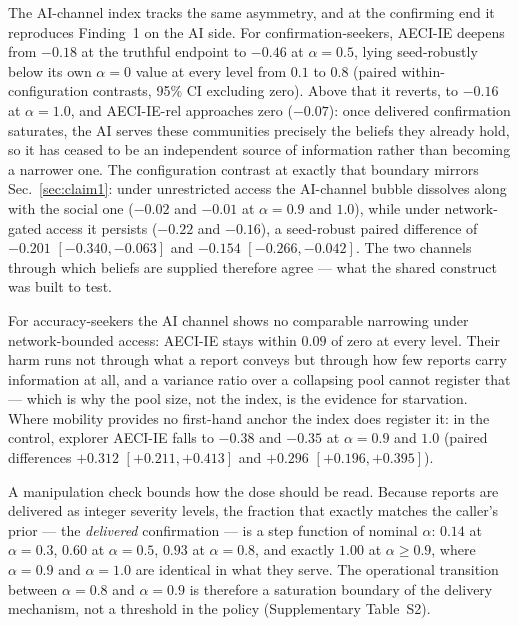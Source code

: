 \documentclass[pdflatex,sn-nature]{sn-jnl}
\begin{document}
The AI-channel index tracks the same asymmetry, and at the confirming end it reproduces Finding~1 on the AI side. For confirmation-seekers, AECI-IE deepens from $-0.18$ at the truthful endpoint to $-0.46$ at $\alpha = 0.5$, lying seed-robustly below its own $\alpha = 0$ value at every level from $0.1$ to $0.8$ (paired within-configuration contrasts, 95\% CI excluding zero). Above that it reverts, to $-0.16$ at $\alpha = 1.0$, and AECI-IE-rel approaches zero ($-0.07$): once delivered confirmation saturates, the AI serves these communities precisely the beliefs they already hold, so it has ceased to be an independent source of information rather than becoming a narrower one. The configuration contrast at exactly that boundary mirrors Sec.~\ref{sec:claim1}: under unrestricted access the AI-channel bubble dissolves along with the social one ($-0.02$ and $-0.01$ at $\alpha = 0.9$ and $1.0$), while under network-gated access it persists ($-0.22$ and $-0.16$), a seed-robust paired difference of $-0.201$ $[-0.340, -0.063]$ and $-0.154$ $[-0.266, -0.042]$. The two channels through which beliefs are supplied therefore agree --- what the shared construct was built to test.

For accuracy-seekers the AI channel shows no comparable narrowing under network-bounded access: AECI-IE stays within $0.09$ of zero at every level. Their harm runs not through what a report conveys but through how few reports carry information at all, and a variance ratio over a collapsing pool cannot register that --- which is why the pool size, not the index, is the evidence for starvation. Where mobility provides no first-hand anchor the index does register it: in the control, explorer AECI-IE falls to $-0.38$ and $-0.35$ at $\alpha = 0.9$ and $1.0$ (paired differences $+0.312$ $[+0.211, +0.413]$ and $+0.296$ $[+0.196, +0.395]$).

A manipulation check bounds how the dose should be read. Because reports are delivered as integer severity levels, the fraction that exactly matches the caller's prior --- the \emph{delivered} confirmation --- is a step function of nominal $\alpha$: $0.14$ at $\alpha = 0.3$, $0.60$ at $\alpha = 0.5$, $0.93$ at $\alpha = 0.8$, and exactly $1.00$ at $\alpha \geq 0.9$, where $\alpha = 0.9$ and $\alpha = 1.0$ are identical in what they serve. The operational transition between $\alpha = 0.8$ and $\alpha = 0.9$ is therefore a saturation boundary of the delivery mechanism, not a threshold in the policy (Supplementary Table~S2).
\end{document}
